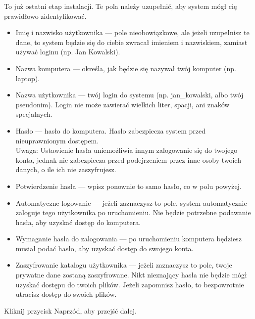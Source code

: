 To już ostatni etap instalacji. Te pola należy uzupełnić, aby system mógł cię prawidłowo zidentyfikować.
\begin{itemize}
\item \textcolor{ubuntu_orange}{Imię i nazwisko użytkownika} --- pole nieobowiązkowe, ale jeżeli uzupełnisz te dane, to system będzie się do ciebie zwracał imieniem i nazwiskiem, zamiast używać loginu (np. Jan Kowalski).
\item \textcolor{ubuntu_orange}{Nazwa komputera} --- określa, jak będzie się nazywał twój komputer (np. laptop).
\item \textcolor{ubuntu_orange}{Nazwa użytkownika} --- twój login do systemu (np. jan\_kowalski, albo twój pseudonim). Login nie może zawierać wielkich liter, spacji, ani znaków specjalnych.
\item \textcolor{ubuntu_orange}{Hasło} --- hasło do komputera. Hasło zabezpiecza system przed nieuprawnionym dostępem.\\
Uwaga: Ustawienie hasła uniemożliwia innym zalogowanie się do twojego konta, jednak nie zabezpiecza przed podejrzeniem przez inne osoby twoich danych, o ile ich nie zaszyfrujesz. 
\item \textcolor{ubuntu_orange}{Potwierdzenie hasła} --- wpisz ponownie to samo hasło, co w polu powyżej.
\item \textcolor{ubuntu_orange}{Automatyczne logowanie} --- jeżeli zaznaczysz to pole, system automatycznie zaloguje tego użytkownika po uruchomieniu. Nie będzie potrzebne podawanie hasła, aby uzyskać dostęp do komputera.
\item \textcolor{ubuntu_orange}{Wymaganie hasła do zalogowania} --- po uruchomieniu komputera będziesz musiał podać hasło, aby uzyskać dostęp do swojego konta.
\item \textcolor{ubuntu_orange}{Zaszyfrowanie katalogu użytkownika} --- jeżeli zaznaczysz to pole, twoje prywatne dane zostaną zaszyfrowane. Nikt nieznający hasła nie będzie mógł uzyskać dostępu do twoich plików. Jeżeli zapomnisz hasło, to bezpowrotnie utracisz dostęp do swoich plików.
\end{itemize}
\begin{flushright}
Kliknij przycisk \textcolor{ubuntu_orange}{Naprzód}, aby przejść dalej.
\end{flushright}
\clearpage

